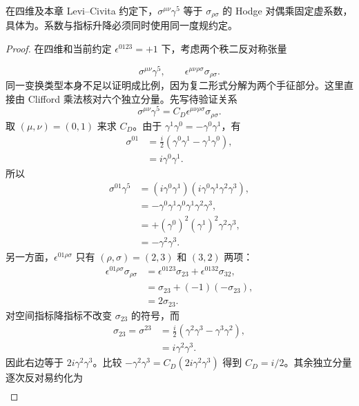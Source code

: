 \begin{lemma}
在四维及本章 Levi--Civita 约定下，$\sigma^{\mu\nu}\gamma^5$ 等于 $\sigma_{\rho\sigma}$ 的 Hodge 对偶乘固定虚系数，具体为。系数与指标升降必须同时使用同一度规约定。
\end{lemma}
\begin{proof}
在四维和当前约定 $\epsilon^{0123}=+1$ 下，考虑两个秩二反对称张量

\begin{equation*}
\sigma^{\mu\nu}\gamma^5,
\qquad
\epsilon^{\mu\nu\rho\sigma}\sigma_{\rho\sigma}.
\end{equation*}
同一变换类型本身不足以证明成比例，因为复二形式分解为两个手征部分。这里直接由 Clifford 乘法核对六个独立分量。先写待验证关系
\begin{equation*}
\sigma^{\mu\nu}\gamma^5
=C_D\epsilon^{\mu\nu\rho\sigma}\sigma_{\rho\sigma}.
\end{equation*}
取 $(\mu,\nu)=(0,1)$ 来求 $C_D$。由于
$\gamma^1\gamma^0=-\gamma^0\gamma^1$，有
\begin{align*}
\sigma^{01}
&=\frac{i}{2}(\gamma^0\gamma^1-\gamma^1\gamma^0),\\
&=i\gamma^0\gamma^1.
\end{align*}
所以
\begin{align*}
\sigma^{01}\gamma^5
&=(i\gamma^0\gamma^1)
(i\gamma^0\gamma^1\gamma^2\gamma^3),\\
&=-\gamma^0\gamma^1\gamma^0\gamma^1\gamma^2\gamma^3,\\
&=+(\gamma^0)^2(\gamma^1)^2\gamma^2\gamma^3,\\
&=-\gamma^2\gamma^3.
\end{align*}
另一方面，$\epsilon^{01\rho\sigma}$ 只有 $(\rho,\sigma)=(2,3)$ 和 $(3,2)$ 两项：
\begin{align*}
\epsilon^{01\rho\sigma}\sigma_{\rho\sigma}
&=\epsilon^{0123}\sigma_{23}+\epsilon^{0132}\sigma_{32},\\
&=\sigma_{23}+(-1)(-\sigma_{23}),\\
&=2\sigma_{23}.
\end{align*}
对空间指标降指标不改变 $\sigma_{23}$ 的符号，而
\begin{align*}
\sigma_{23}=\sigma^{23}
&=\frac{i}{2}(\gamma^2\gamma^3-\gamma^3\gamma^2),\\
&=i\gamma^2\gamma^3.
\end{align*}
因此右边等于 $2i\gamma^2\gamma^3$。比较
$-\gamma^2\gamma^3=C_D(2i\gamma^2\gamma^3)$ 得到
$C_D=i/2$。其余独立分量逐次反对易约化为
\begin{align*}

\end{align*}
\end{proof}

